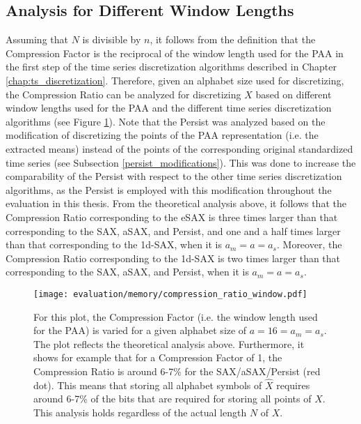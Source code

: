 \subsection*{Analysis for Different Window Lengths}
Assuming that $N$ is divisible by $n$, it follows from the definition that the Compression Factor is the reciprocal of the window length used for the \ac{PAA} in the first step of the time series discretization algorithms described in Chapter \ref{chap:ts_discretization}. Therefore, given an alphabet size used for discretizing, the Compression Ratio can be analyzed for discretizing $X$ based on different window lengths used for the \ac{PAA} and the different time series discretization algorithms (see Figure \ref{fig:compression_ratio_window}). Note that the Persist was analyzed based on the modification of discretizing the points of the \ac{PAA} representation (i.e. the extracted means) instead of the points of the corresponding original standardized time series (see Subsection \ref{persist_modifications}). This was done to increase the comparability of the Persist with respect to the other time series discretization algorithms, as the Persist is employed with this modification throughout the evaluation in this thesis. \newline
From the theoretical analysis above, it follows that the Compression Ratio corresponding to the \ac{eSAX} is three times larger than that corresponding to the \ac{SAX}, \ac{aSAX}, and Persist, and one and a half times larger than that corresponding to the \ac{1d-SAX}, when it is $a_m = a = a_s$. Moreover, the Compression Ratio corresponding to the \ac{1d-SAX} is two times larger than that corresponding to the \ac{SAX}, \ac{aSAX}, and Persist, when it is $a_m = a = a_s$.
\begin{figure}[htb]
\centering
\texttt{[image: evaluation/memory/compression\_ratio\_window.pdf]}
\caption[Memory Requirements - Effect of Window Length]{For this plot, the Compression Factor (i.e. the window length used for the \ac{PAA}) is varied for a given alphabet size of $a = 16 = a_m = a_s$. The plot reflects the theoretical analysis above. Furthermore, it shows for example that for a Compression Factor of 1, the Compression Ratio is around 6-7\% for the \ac{SAX}/\ac{aSAX}/Persist (red dot). This means that storing all alphabet symbols of $\hat{X}$ requires around 6-7\% of the bits that are required for storing all points of $X$. This analysis holds regardless of the actual length $N$ of $X$.}
\label{fig:compression_ratio_window}
\end{figure}
\newpage
